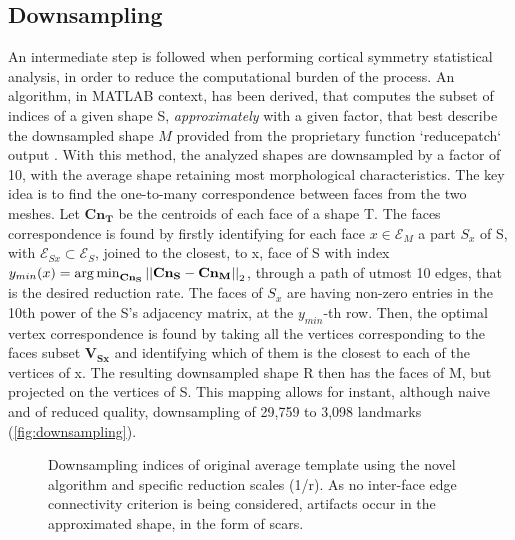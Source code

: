 \subsection{Downsampling}
\label{subsec:downsampling}
An intermediate step is followed when performing cortical symmetry statistical analysis, in order to reduce the computational burden of the process. An algorithm, in MATLAB context, has been derived, that computes the subset of indices of a given shape S, \textit{approximately} with a given factor, that best describe the downsampled shape $M$ provided from the  proprietary function `reducepatch` output \cite{Lopez2014}. With this method, the analyzed shapes are downsampled by a factor of 10, with the average shape retaining most morphological characteristics. The key idea is to find the one-to-many correspondence between faces from the two meshes. Let $\mathbf{{Cn}_T}$ be the centroids of each face of a shape T. The faces correspondence is found by firstly identifying for each face $x\in \mathcal{E}_M$ a part $S_x$ of S, with $\mathcal{E}_{Sx}\subset \mathcal{E}_S$, joined to the closest, to x, face of S with index $y_{min}(x)=\operatorname*{arg\,min}_{\mathbf{{Cn}_{S}}}\left|\left|\mathbf{{Cn}_{S}}-\mathbf{{Cn}_M}\right|\right|_2$, through a path of utmost 10 edges, that is the desired reduction rate. The faces of $S_x$ are having non-zero entries in the 10th power of the S's adjacency matrix, at the $y_{min}$-th row. Then, the optimal vertex correspondence is found by taking all the vertices corresponding to the faces subset $\mathbf{{V}_{Sx}}$ and identifying which of them is the closest to each of the vertices of x. The resulting downsampled shape R then has the faces of M, but projected on the vertices of S. This mapping allows for instant, although naive and of reduced quality, downsampling of 29,759 to 3,098 landmarks (\autoref{fig:downsampling}).
\begin{figure}[H]
	\centering
	
	\caption[Cortical surface downsampling]{Downsampling indices of original average template using the novel algorithm and specific reduction scales (1/r). As no inter-face edge connectivity criterion is being considered, artifacts occur in the approximated shape, in the form of scars.}
	\label{fig:downsampling}
\end{figure}

